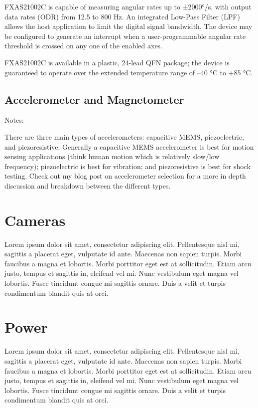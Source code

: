 \documentclass[letterpaper]{report}
\begin{document}
FXAS21002C is capable of measuring angular rates up to ±2000°/s, with output data rates (ODR) from 12.5 to 800 Hz. An integrated Low-Pass Filter (LPF) allows the host application to
limit the digital signal bandwidth. The device may be configured to generate an interrupt when a user-programmable angular rate threshold is crossed on any one of the enabled axes.

FXAS21002C is available in a plastic, 24-lead QFN package; the device is guaranteed to operate over the extended temperature range of –40 °C to +85 °C.

\section{Accelerometer and Magnetometer}
Notes:

There are three main types of accelerometers: capacitive MEMS, piezoelectric, and piezoresistive. Generally a capacitive MEMS accelerometer is best for motion sensing applications (think human motion which is relatively slow/low frequency); piezoelectric is best for vibration; and piezoresistive is best for shock testing. Check out my blog post on accelerometer selection for a more in depth discussion and breakdown between the different types.

\chapter{Cameras}
Lorem ipsum dolor sit amet, consectetur adipiscing elit. Pellentesque nisl mi, sagittis a placerat eget, vulputate id ante. Maecenas non sapien turpis. Morbi faucibus a magna et lobortis. Morbi porttitor eget est at sollicitudin. Etiam arcu justo, tempus et sagittis in, eleifend vel mi. Nunc vestibulum eget magna vel lobortis. Fusce tincidunt congue mi sagittis ornare. Duis a velit et turpis condimentum blandit quis at orci.

\chapter{Power}
Lorem ipsum dolor sit amet, consectetur adipiscing elit. Pellentesque nisl mi, sagittis a placerat eget, vulputate id ante. Maecenas non sapien turpis. Morbi faucibus a magna et lobortis. Morbi porttitor eget est at sollicitudin. Etiam arcu justo, tempus et sagittis in, eleifend vel mi. Nunc vestibulum eget magna vel lobortis. Fusce tincidunt congue mi sagittis ornare. Duis a velit et turpis condimentum blandit quis at orci.
\end{document}
